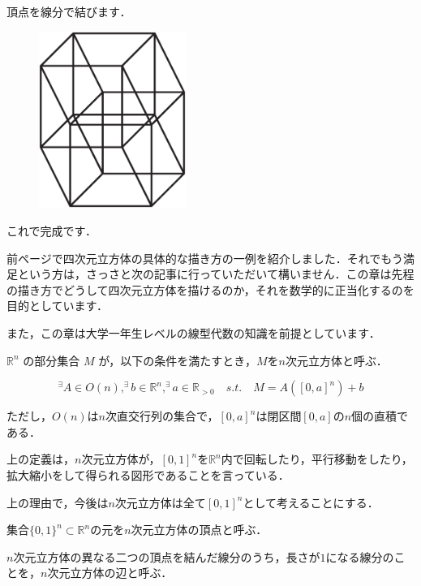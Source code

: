 \documentclass[./main]{subfiles} %
\begin{document}

頂点を線分で結びます．

\begin{figure}[h]
\begin{center}
\includegraphics[width=48mm]{mask_rittai3.eps}
\end{center}
\end{figure}

これで完成です．


前ページで四次元立方体の具体的な描き方の一例を紹介しました．それでもう満足という方は，さっさと次の記事に行っていただいて構いません．この章は先程の描き方でどうして四次元立方体を描けるのか，それを数学的に正当化するのを目的としています．

また，この章は大学一年生レベルの線型代数の知識を前提としています．

\maskdefi [$n$次元立方体]

$\mathbb{R}^n$ の部分集合 $M$ が，以下の条件を満たすとき，$M$を$n$次元立方体と呼ぶ．

\[
^\exists A \in O(n) , ^\exists b \in \mathbb{R}^n , ^\exists a \in \mathbb{R}_{>0} \quad s.t. \quad M = A ([0,a]^n) + b
\]

ただし，$O(n)$は$n$次直交行列の集合で，$[0,a]^n$は閉区間$[0,a]$の$n$個の直積である．

\rem

上の定義は，$n$次元立方体が，$[0,1]^n$を$\mathbb{R}^n$内で回転したり，平行移動をしたり，拡大縮小をして得られる図形であることを言っている．

\rem
上の理由で，今後は$n$次元立方体は全て$[0,1]^n$として考えることにする．

\maskdefi [頂点]

集合$\{0,1\} ^n \subset \mathbb{R}^n$の元を$n$次元立方体の{\gt 頂点}と呼ぶ．

\maskdefi[辺]
$n$次元立方体の異なる二つの頂点を結んだ線分のうち，長さが$1$になる線分のことを，$n$次元立方体の{\gt 辺}と呼ぶ．
\end{document}
